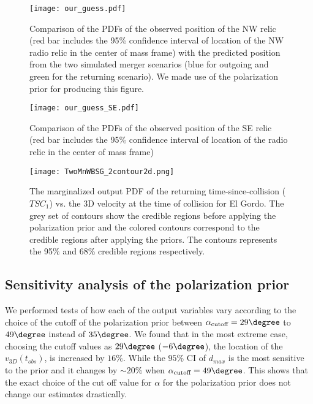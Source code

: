 \begin{figure}
	\texttt{[image: our\_guess.pdf]}
	\caption{Comparison of the PDFs of the observed position of the NW relic (red bar
		includes the 95\% confidence interval of location of the NW radio relic in the center of mass frame) with the predicted position from the two simulated merger
		scenarios (blue for outgoing and green for the returning scenario).
	We made use of the polarization prior for producing this figure.} 
	\label{fig:our_guessed_scenario}
\end{figure}
\begin{figure}
	\texttt{[image: our\_guess\_SE.pdf]}
	\caption{Comparison of the PDFs of the observed position of the SE relic (red bar
	includes the 95\% confidence interval of location of the radio relic in
the center of mass frame)}
\end{figure}
\begin{figure}
	\texttt{[image: TwoMnWBSG\_2contour2d.png]}
	\caption{The marginalized output PDF of the returning time-since-collision
($TSC_1$) vs. the 3D velocity at the time of collision for El Gordo. The
grey set of contours show the credible regions before applying the
polarization prior and the colored contours correspond to the credible
regions after applying the priors. The contours represents the 95\% and
68\% credible regions respectively. }
	\label{fig:TSC_v3D}
\end{figure}

\subsection{Sensitivity analysis of the polarization prior}
%
\label{sec:sensitivityTests}
We performed tests of how each of the output variables vary according to the
choice of the cutoff of the polarization prior between
$\alpha_{\text{cutoff}} =
29 \degree$ to $49\degree$ instead of $35 \degree$.  
We found that in the most extreme case, choosing the cutoff values as $29
\degree$ ($-6 \degree$), the location of the $v_{3D}(t_{obs})$, is
increased by $ 16 \%$. While the $95\%$ CI of $d_{max}$ is
the most sensitive to the prior and it changes by
$\sim20 \%$ when $\alpha_{\text{cutoff}} = 49 \degree$. 
This shows that the exact choice of the cut off value for $\alpha$ for the
polarization prior does not change our estimates drastically.




